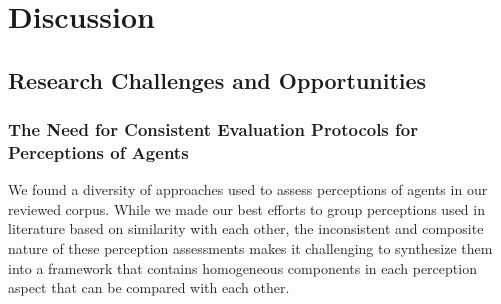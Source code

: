 
\section{Discussion}

\subsection{Research Challenges and Opportunities}


\subsubsection{The Need for Consistent Evaluation Protocols for Perceptions of Agents}

We found a diversity of approaches used to assess perceptions of agents in our reviewed corpus. While we made our best efforts to group perceptions used in literature based on similarity with each other, the inconsistent and composite nature of these perception assessments makes it challenging to synthesize them into a framework that contains homogeneous components in each perception aspect that can be compared with each other.

